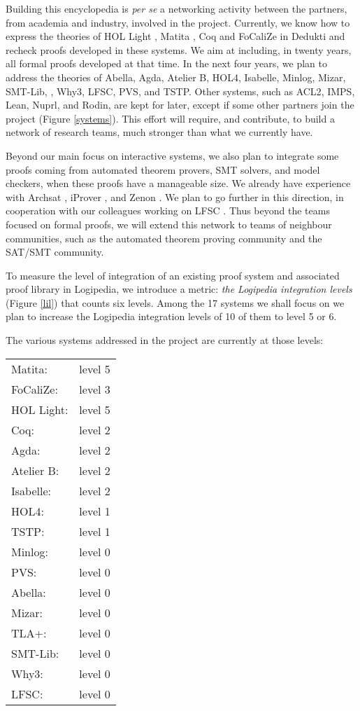 Building this encyclopedia is {\em per se} a networking activity
between the partners, from academia and industry, involved in the
project.  Currently, we know how to express the theories of {\sf HOL
  Light} \cite{Assaf12}, {\sf Matita} \cite{Assaf15}, {\sf Coq} and
{\sf FoCaliZe} \cite{Cauderlier16} in {\sf Dedukti} and recheck proofs
developed in these systems.  We aim at including, in twenty years, all
formal proofs developed at that time.
In the next four years, we plan to address the theories of {\sf
  Abella}, {\sf Agda}, {\sf Atelier B}, {\sf HOL4}, {\sf Isabelle},
{\sf Minlog}, {\sf Mizar}, {\sf SMT-Lib}, \tlaplus, {\sf Why3}, {\sf
  LFSC}, {\sf PVS}, and {\sf TSTP}.  Other systems, such as {\sf
  ACL2}, {\sf IMPS}, {\sf Lean}, {\sf Nuprl}, and {\sf Rodin}, are
kept for later, except if some other partners join the project (Figure
\ref{systems}). This effort will require, and contribute, to build a
network of research teams, much stronger than what we currently have.

Beyond our main focus on interactive systems, we also plan to
integrate some proofs coming from automated theorem provers, SMT
solvers, and model checkers, when these proofs have a manageable
size. We already have experience with Archsat \cite{Bury19}, iProver
\cite{Burel10}, and Zenon \cite{CauderlierHalmagrand15}. We plan to go
further in this direction, in cooperation with our colleagues working
on LFSC \cite{Stump09}. Thus beyond the teams focused on formal proofs, we
will extend this network to teams of neighbour communities, such as
the automated theorem proving community and the SAT/SMT community.

To measure the level of integration of an existing proof system and
associated proof library in {\sf Logipedia}, we introduce a metric:
{\em the {\sf Logipedia} integration levels} (Figure \ref{lil}) that
counts six levels.  Among the 17 systems we shall focus on we plan to
increase the {\sf Logipedia} integration levels of 10 of them to level
5 or 6.

The various systems addressed in the project are currently at those levels:

\begin{tabular}{ll}
Matita:& level 5\\
FoCaliZe:& level 3\\
HOL Light:& level 5\\
Coq:& level 2\\
Agda:& level 2\\
Atelier B:& level 2\\
Isabelle:& level 2\\
HOL4:& level 1\\
TSTP:& level 1\\
Minlog:& level 0\\
PVS:& level 0\\
Abella:& level 0\\
Mizar:& level 0\\
TLA+:& level 0\\
SMT-Lib:& level 0\\
Why3:& level 0\\
LFSC:& level 0\\

\end{tabular}

